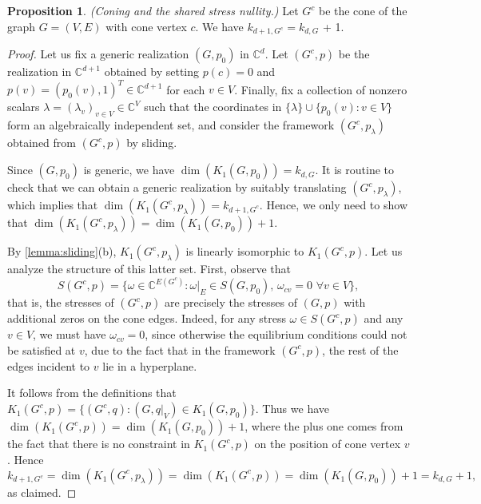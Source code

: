\documentclass[11pt,a4paper,dvipsnames]{scrartcl}
\theoremstyle{definition}
\newtheorem{proposition}[theorem]{Proposition}
\newcommand{\CC}{\mathbb{C}}
\newcommand{\stressnullity}[1]{k_{d, #1}}
\newcommand{\stressnullitydim}[2]{k_{#2,#1}}
\newcommand{\coneG}{G^c}
\begin{document}
\begin{proposition}\label{proposition:stressnullityconing} \emph{(Coning and the shared stress nullity.)} \newline
    Let $\coneG$ be the cone of the graph $G = (V,E)$ with cone vertex $c$. We have $\stressnullitydim{\coneG}{d+1} = \stressnullity{G}$ + 1.
\end{proposition}
\begin{proof}
    Let us fix a generic realization $(G,p_0)$ in $\CC^d$. Let $(\coneG,p)$ be the realization in $\CC^{d+1}$ obtained by setting $p(c) = 0$ and $p(v) = {(p_0(v),1)}^T \in \CC^{d+1}$ for each $v \in V$. Finally, fix a collection of nonzero scalars $\lambda = {(\lambda_v)}_{v \in V} \in \CC^V$ such that the coordinates in $\{\lambda\} \cup \{p_0(v) : v \in V\}$ form an algebraically independent set, and consider the framework $(\coneG,p_\lambda)$ obtained from $(\coneG,p)$ by sliding.

    Since $(G,p_0)$ is generic, we have $\dim(K_1(G,p_0)) = \stressnullity{G}$. It is routine to check that we can obtain a generic realization by suitably translating $(\coneG,p_\lambda)$, which implies that $\dim(K_1(\coneG,p_\lambda)) = \stressnullitydim{\coneG}{d+1}$. Hence, we only need to show that $\dim(K_1(\coneG,p_\lambda)) = \dim(K_1(G,p_0)) + 1$. 
    
    By \cref{lemma:sliding}(b), $K_1(\coneG,p_\lambda)$ is linearly isomorphic to $K_1(\coneG,p)$. Let us analyze the structure of this latter set. First, observe that \[S(\coneG,p) = \{\omega \in \CC^{E(\coneG)}: \omega|_{E} \in S(G,p_0), \, \omega_{cv} = 0 \, \, \forall v \in V\},\] that is, the stresses of $(\coneG,p)$ are precisely the stresses of $(G,p)$ with additional zeros on the cone edges. Indeed, for any stress $\omega \in S(\coneG,p)$ and any $v \in V$, we must have $\omega_{cv} = 0$, since otherwise the equilibrium conditions could not be satisfied at $v$, due to the fact that in the framework $(\coneG,p)$, the rest of the edges incident to $v$ lie in a hyperplane. 
    
    It follows from the definitions that $K_1(\coneG,p) = \{(\coneG,q) : (G,q|_V) \in K_1(G,p_0)\}$. Thus we have $\dim(K_1(\coneG,p)) = \dim(K_1(G,p_0)) + 1$, where the plus one comes from the fact that there is no constraint in $K_1(\coneG,p)$ on the position of cone vertex $v$. Hence \[\stressnullitydim{\coneG}{d+1} = \dim(K_1(\coneG,p_\lambda)) = \dim(K_1(\coneG,p)) = \dim(K_1(G,p_0))+1 = \stressnullity{G} +1,\]as claimed.
\end{proof}
\end{document}
